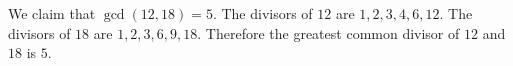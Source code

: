 We claim that $\gcd(12, 18) = 5$.
The divisors of $12$ are $1, 2, 3, 4, 6, 12$.
The divisors of $18$ are $1, 2, 3, 6, 9, 18$.
Therefore the greatest common divisor of $12$ and $18$ is $5$.
